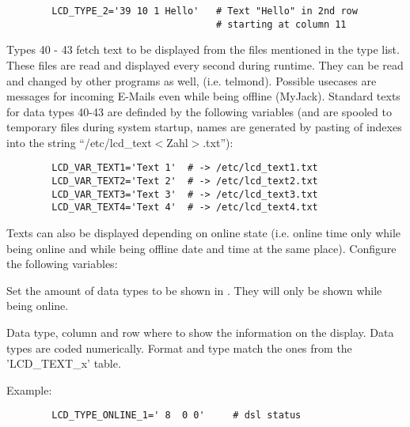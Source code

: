 \begin{description}
\begin{example}
\begin{verbatim}
        LCD_TYPE_2='39 10 1 Hello'   # Text "Hello" in 2nd row 
                                     # starting at column 11
\end{verbatim}
\end{example}

      
      Types 40 - 43 fetch text to be displayed from the files mentioned 
      in the type list. These files are read and displayed every second 
      during runtime. They can be read and changed by other programs as 
      well, (i.e. telmond). Possible usecases are messages for incoming 
      \mbox{E-Mails} even while being offline (MyJack). Standard texts 
      for data types 40-43 are definded by the following variables (and 
      are spooled to temporary files during system startup, names are
      generated by pasting of indexes into the string
      ``/etc/lcd\_text$<$Zahl$>$.txt''):

\begin{example}
\begin{verbatim}
        LCD_VAR_TEXT1='Text 1'  # -> /etc/lcd_text1.txt
        LCD_VAR_TEXT2='Text 2'  # -> /etc/lcd_text2.txt
        LCD_VAR_TEXT3='Text 3'  # -> /etc/lcd_text3.txt
        LCD_VAR_TEXT4='Text 4'  # -> /etc/lcd_text4.txt
\end{verbatim}
\end{example}

    Texts can also be displayed depending on online state (i.e. online time 
    only while being online and while being offline date and time at the same 
    place).
    Configure the following variables:


      Set the amount of data types to be shown in . 
      They will only be shown while being online.



       Data type, column and row where to 
      show the information on the display. Data types are coded numerically.
      Format and type match the ones from the 'LCD\_TEXT\_x' table.

      Example:
\begin{example}
\begin{verbatim}
        LCD_TYPE_ONLINE_1=' 8  0 0'     # dsl status
\end{verbatim}
\end{example}



\end{description}
